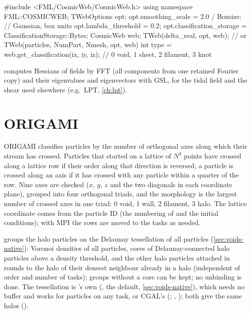 \begin{cppcode}
#include <FML/CosmicWeb/CosmicWeb.h>
using namespace FML::COSMICWEB;
TWebOptions opt;
opt.smoothing_scale  = 2.0 / Boxsize;     // Gaussian, box units
opt.lambda_threshold = 0.2;
opt.classification_storage = ClassificationStorage::Bytes;
CosmicWeb web;
TWeb(delta_real, opt, web);               // or TWeb(particles, NumPart, Nmesh, opt, web)
int type = web.get_classification({ix, iy, iz});   // 0 void, 1 sheet, 2 filament, 3 knot
\end{cppcode}

 computes Hessians of fields by FFT (all components from one retained Fourier copy) and their eigenvalues and
eigenvectors with GSL, for the tidal field and the shear used elsewhere (e.g.\ LPT, \cref{ch:lpt}).

\section{ORIGAMI}\label{sec:web-origami}

ORIGAMI \cite{Falck2012} classifies particles by the number of orthogonal axes along which their stream has crossed. Particles that started on a
lattice of $N^3$ points have crossed along a lattice row if their order along that direction is reversed; a particle is crossed along an axis if
it has crossed with any particle within a quarter of the row. Nine axes are checked ($x$, $y$, $z$ and the two diagonals in each coordinate
plane), grouped into four orthogonal triads, and the morphology is the largest number of crossed axes in one triad: 0 void, 1 wall, 2 filament,
3 halo. The lattice coordinate comes from the particle ID (the numbering of  and the initial conditions); with MPI the
rows are moved to the tasks as needed.

 groups the halo particles on the Delaunay tessellation of all particles (\cref{sec:voids-native}): Voronoi densities of all
particles, cores of Delaunay-connected halo particles above a density threshold, and the other halo particles attached in rounds to the halo of
their densest neighbour already in a halo (independent of order and number of tasks); groups without a core can be kept; no unbinding is done.
The tessellation is \fml{}'s own  (, the default,
\cref{sec:voids-native}), which needs no buffer and works for particles on any task, or CGAL's  (;
, ); both give the same halos
().

